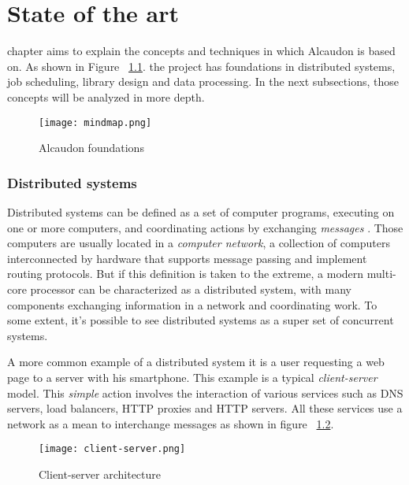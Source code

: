 \chapter{State of the art}
\label{chap:stateoftheart}

 chapter aims to explain the concepts and techniques in which
Alcaudon is based on. As shown in Figure ~\ref{fig:mindmap}. the project has foundations in
distributed systems, job scheduling, library design and data processing. In the
next subsections, those concepts will be analyzed in more depth.

\begin{figure}[!h]
\begin{center}
\texttt{[image: mindmap.png]}
\caption{Alcaudon foundations}
\label{fig:mindmap}
\end{center}
\end{figure}

\subsection{Distributed systems}

Distributed systems can be defined as a set of computer programs, executing on
one or more computers, and coordinating actions by exchanging \textit{messages}
\cite{GuideReliable}. Those computers are usually located in a \textit{computer
  network}, a collection of computers interconnected by hardware that supports
message passing and implement routing protocols. But if this definition is taken
to the extreme, a modern multi-core processor can be characterized as a
distributed system, with many components exchanging information in a network and
coordinating work. To some extent, it's possible to see distributed systems as a
super set of concurrent systems.

A more common example of a distributed system it is a user requesting a web page to
a server with his smartphone. This example is a typical \textit{client-server}
model. This \textit{simple} action involves the interaction of various services
such as DNS servers, load balancers, HTTP proxies and HTTP servers. All these
services use a network as a mean to interchange messages as shown in figure
~\ref{fig:client-server}.

\begin{figure}[!h]
\begin{center}
\texttt{[image: client-server.png]}
\caption{Client-server architecture}
\label{fig:client-server}
\end{center}
\end{figure}

